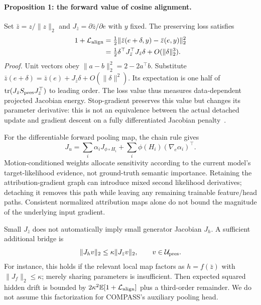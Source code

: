 \paragraph{Proposition 1: the forward value of cosine alignment.}
Set $\bar z=z/\|z\|_2$ and $J_{\bar z}=\partial\bar z/\partial e$ with
$y$ fixed. The preserving loss satisfies
\begin{equation}
\begin{aligned}
 1+\mathcal L_{\rm align}
 &=\tfrac12\|\bar z(e+\delta,y)-\bar z(e,y)\|_2^2\\
 &=\tfrac12\delta^\top J_{\bar z}^\top J_{\bar z}\delta
 +O(\|\delta\|_2^3).
\end{aligned}
\label{eq:theory_alignment}
\end{equation}
\emph{Proof.} Unit vectors obey $\|a-b\|_2^2=2-2a^\top b$.
Substitute $\bar z(e+\delta)=\bar z(e)+J_{\bar z}\delta+O(\|\delta\|^2)$.
Its expectation is one half of
$\operatorname{tr}(J_{\bar z}S_{\rm pres}J_{\bar z}^\top)$ to leading order.
The loss value thus measures data-dependent projected Jacobian energy.
Stop-gradient preserves this value but changes its parameter derivative:
this is not an equivalence between the actual detached update and gradient
descent on a fully differentiated Jacobian penalty~\cite{chen2021exploring}.

For the differentiable forward pooling map, the chain rule gives
\begin{equation}
 J_u=\sum_i\alpha_i J_{\phi\circ H_i}
 +\sum_i\phi(H_i)(\nabla_e\alpha_i)^\top.
\label{eq:theory_pooling_jacobian}
\end{equation}
Motion-conditioned weights allocate sensitivity according to the current
model's target-likelihood evidence, not ground-truth semantic importance.
Retaining the attribution-gradient graph can introduce mixed second
likelihood derivatives; detaching it removes this path while leaving any
remaining trainable feature/head paths. Consistent normalized attribution
maps alone do not bound the magnitude of the underlying input gradient.

Small $J_{\bar z}$ does not automatically imply small generator Jacobian
$J_h$. A sufficient additional bridge is
\begin{equation}
 \|J_h v\|_2\le\kappa\|J_{\bar z}v\|_2,
 \qquad v\in\mathcal U_{\rm pres}.
\label{eq:theory_bridge}
\end{equation}
For instance, this holds if the relevant local map factors as $h=f(\bar z)$
with $\|J_f\|_2\le\kappa$; merely sharing parameters is insufficient.
Then expected squared hidden drift is bounded by
$2\kappa^2\mathbb E[1+\mathcal L_{\rm align}]$ plus a third-order remainder.
We do not assume this factorization for COMPASS's auxiliary pooling head.

